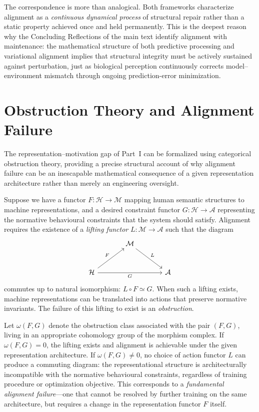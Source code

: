 \documentclass[12pt]{article}
\theoremstyle{definition}
\begin{document}
The correspondence is more than analogical. Both frameworks characterize
alignment as a \emph{continuous dynamical process} of structural repair rather
than a static property achieved once and held permanently. This is the deepest
reason why the Concluding Reflections of the main text identify alignment with
maintenance: the mathematical structure of both predictive processing and
variational alignment implies that structural integrity must be actively
sustained against perturbation, just as biological perception continuously
corrects model--environment mismatch through ongoing prediction-error
minimization.

\section{Obstruction Theory and Alignment Failure}
\label{app:obstruction}

The representation--motivation gap of Part~I can be formalized using categorical
obstruction theory, providing a precise structural account of why alignment
failure can be an inescapable mathematical consequence of a given representation
architecture rather than merely an engineering oversight.

Suppose we have a functor $F : \mathcal{H} \to \mathcal{M}$ mapping human
semantic structures to machine representations, and a desired constraint functor
$G : \mathcal{H} \to \mathcal{A}$ representing the normative behavioural
constraints that the system should satisfy. Alignment requires the existence of
a \emph{lifting functor} $L : \mathcal{M} \to \mathcal{A}$ such that the
diagram
\begin{equation}
\begin{tikzcd}[column sep=large, row sep=large]
& \mathcal{M} \arrow[dr, "L"] & \\
\mathcal{H} \arrow[ur, "F"] \arrow[rr, "G"'] & & \mathcal{A}
\end{tikzcd}
\end{equation}
commutes up to natural isomorphism: $L \circ F \simeq G$. When such a lifting
exists, machine representations can be translated into actions that preserve
normative invariants. The failure of this lifting to exist is an
\emph{obstruction}.

Let $\omega(F, G)$ denote the obstruction class associated with the pair
$(F, G)$, living in an appropriate cohomology group of the morphism complex.
If $\omega(F, G) = 0$, the lifting exists and alignment is achievable under the
given representation architecture. If $\omega(F, G) \neq 0$, no choice of
action functor $L$ can produce a commuting diagram: the representational
structure is architecturally incompatible with the normative behavioural
constraints, regardless of training procedure or optimization objective. This
corresponds to a \emph{fundamental alignment failure}---one that cannot be
resolved by further training on the same architecture, but requires a change
in the representation functor $F$ itself.
\end{document}
